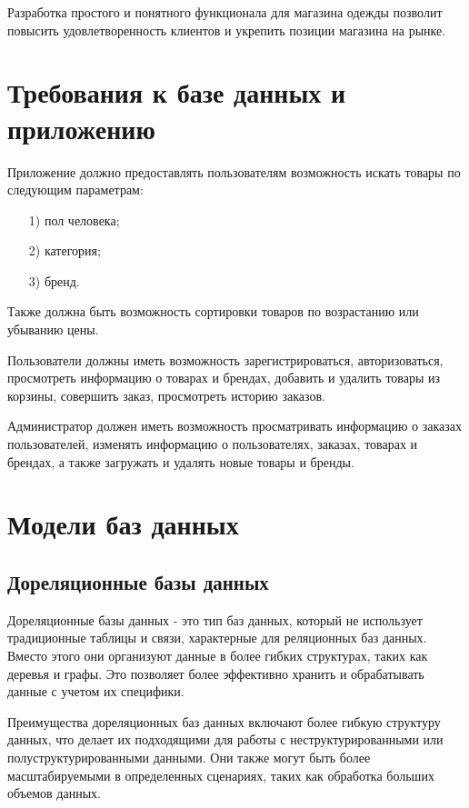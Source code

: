 \documentclass{bmstu}
\begin{document}
Разработка простого и понятного функционала для магазина одежды позволит повысить удовлетворенность клиентов и укрепить позиции магазина на рынке.

\section{Требования к базе данных и приложению}

Приложение должно предоставлять пользователям возможность искать товары по следующим параметрам:
\begin{enumerate}
	\item[1)] пол человека;
	\item[2)] категория;
	\item[3)] бренд.
\end{enumerate}

Также должна быть возможность сортировки товаров по возрастанию или убыванию цены.

Пользователи должны иметь возможность зарегистрироваться, авторизоваться, просмотреть информацию о товарах и брендах, добавить и удалить товары из корзины, совершить заказ, просмотреть историю заказов.

Администратор должен иметь возможность просматривать информацию о заказах пользователей, изменять информацию о пользователях, заказах, товарах и брендах, а также загружать и удалять новые товары и бренды.

\section{Модели баз данных}

\subsection{Дореляционные базы данных}

Дореляционные базы данных - это тип баз данных, который не использует традиционные таблицы и связи, характерные для реляционных баз данных. Вместо этого они организуют данные в более гибких структурах, таких как деревья и графы. Это позволяет более эффективно хранить и обрабатывать данные с учетом их специфики.

Преимущества дореляционных баз данных включают более гибкую структуру данных, что делает их подходящими для работы с неструктурированными или полуструктурированными данными. Они также могут быть более масштабируемыми в определенных сценариях, таких как обработка больших объемов данных.
\end{document}
